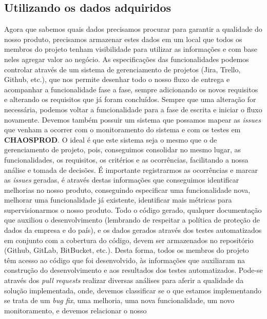     \subsection{Utilizando os dados adquiridos}
      Agora que sabemos quais dados precisamos procurar para garantir a qualidade
      do nosso produto, precisamos armazenar estes dados em um local que todos os
      membros do projeto tenham visibilidade para utilizar as informações e com
      base neles agregar valor ao negócio. As especificações das funcionalidades
      podemos controlar através de um sistema de gerenciamento de projetos (Jira,
      Trello, Github, etc.), que nos permite desenhar todo o nosso fluxo de entrega e
      acompanhar a funcionalidade fase a fase, sempre adicionando os novos requisitos
      e alterando os requisitos que já foram concluídos. Sempre que uma alteração
      for necessária, podemos voltar a funcionalidade para a fase de escrita e
      iniciar o fluxo novamente. Devemos também possuir um sistema que possamos
      mapear as \textit{issues} que venham a ocorrer com o monitoramento do sistema
      e com os testes em \textbf{CHAOSPROD}. O ideal é que este sistema seja o
      mesmo que o de gerenciamento de projeto, pois, conseguimos consolidar no
      mesmo lugar, as funcionalidades, os requisitos, os critérios e as
      ocorrências, facilitando a nossa análise e tomada de decisões. É importante
      registrarmos as ocorrências e marcar as \textit{issues} geradas, é
      através destas informações que conseguimos identificar melhorias no nosso
      produto, conseguindo especificar uma funcionalidade nova, melhorar uma
      funcionalidade já existente, identificar mais métricas para supervisionarmos
      o nosso produto. \newline
      Todo o código gerado, qualquer documentação que auxiliou o desenvolvimento
      (lembrando de respeitar a política de proteção de dados da empresa e do
      país), e os dados gerados através dos testes automatizados em conjunto
      com a cobertura do código, devem ser armazenados no repositório (Github,
      GitLab, BitBucket, etc.). Desta forma, todos os membros do projeto têm
      acesso ao código que foi desenvolvido, às informações que auxiliaram na
      construção do desenvolvimento e aos resultados dos testes automatizados.
      Pode-se através dos \textit{pull requests} realizar diversas análises para
      aferir a qualidade da solução implementada, onde, devemos classificar se o
      que estamos implementando se trata de um \textit{bug fix}, uma melhoria,
      uma nova funcionalidade, um novo monitoramento, e devemos relacionar o nosso
